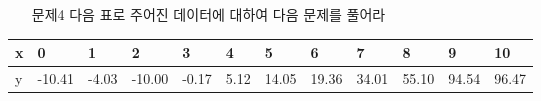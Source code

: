 \documentclass[a4,10pt]{article}
\theoremstyle{examplestyle}
\let\\\tabularnewline
\let\\\tabularnewline
\begin{document}
\begin{itemize}
\item[문제4] 다음 표로 주어진 데이터에 대하여 다음 문제를 풀어라
\end{itemize}
\begin{table}[!hbt]
\centering
\begin{tabular}{l|lllllllllll}
\hline\hline
x&0&1&2&3&4&5&6&7&8&9&10\\
\hline
y&-10.41&-4.03&-10.00&-0.17&5.12&14.05&19.36&34.01&55.10&94.54&96.47\\
\hline\hline
\end{tabular}
\end{table}
\end{document}
